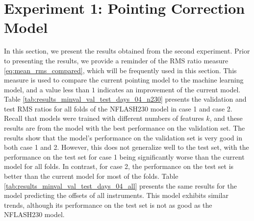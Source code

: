 
\section{Experiment 1: Pointing Correction Model}
In this section, we present the results obtained from the second experiment.
Prior to presenting the results, we provide a reminder of the RMS ratio measure \eqref{eq:mean_rms_compared}, which will be frequently used in this section.
This measure is used to compare the current pointing model to the machine learning model, and a value less than $1$ indicates an improvement of the current model. \\

Table \ref{tab:results_minval_val_test_days_04_n230} presents the validation and test RMS ratios for all folds of the NFLASH230 model in case 1 and case 2.
Recall that models were trained with different numbers of features $k$, and these results are from the model with the best performance on the validation set.
The results show that the model's performance on the validation set is very good in both case 1 and 2.
However, this does not generalize well to the test set, with the performance on the test set for case 1 being significantly worse than the current model for all folds.
In contrast, for case 2, the performance on the test set is better than the current model for most of the folds.
Table \ref{tab:results_minval_val_test_days_04_all} presents the same results for the model predicting the offsets of all instruments.
This model exhibits similar trends, although its performance on the test set is not as good as the NFLASH230 model.\\

